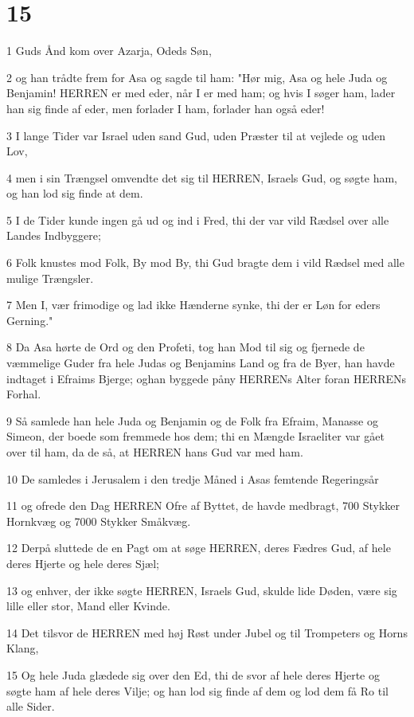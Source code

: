 \chapter{15}

\par 1 Guds Ånd kom over Azarja, Odeds Søn,
\par 2 og han trådte frem for Asa og sagde til ham: "Hør mig, Asa og hele Juda og Benjamin! HERREN er med eder, når I er med ham; og hvis I søger ham, lader han sig finde af eder, men forlader I ham, forlader han også eder!
\par 3 I lange Tider var Israel uden sand Gud, uden Præster til at vejlede og uden Lov,
\par 4 men i sin Trængsel omvendte det sig til HERREN, Israels Gud, og søgte ham, og han lod sig finde at dem.
\par 5 I de Tider kunde ingen gå ud og ind i Fred, thi der var vild Rædsel over alle Landes Indbyggere;
\par 6 Folk knustes mod Folk, By mod By, thi Gud bragte dem i vild Rædsel med alle mulige Trængsler.
\par 7 Men I, vær frimodige og lad ikke Hænderne synke, thi der er Løn for eders Gerning."
\par 8 Da Asa hørte de Ord og den Profeti, tog han Mod til sig og fjernede de væmmelige Guder fra hele Judas og Benjamins Land og fra de Byer, han havde indtaget i Efraims Bjerge; oghan byggede påny HERRENs Alter foran HERRENs Forhal.
\par 9 Så samlede han hele Juda og Benjamin og de Folk fra Efraim, Manasse og Simeon, der boede som fremmede hos dem; thi en Mængde Israeliter var gået over til ham, da de så, at HERREN hans Gud var med ham.
\par 10 De samledes i Jerusalem i den tredje Måned i Asas femtende Regeringsår
\par 11 og ofrede den Dag HERREN Ofre af Byttet, de havde medbragt, 700 Stykker Hornkvæg og 7000 Stykker Småkvæg.
\par 12 Derpå sluttede de en Pagt om at søge HERREN, deres Fædres Gud, af hele deres Hjerte og hele deres Sjæl;
\par 13 og enhver, der ikke søgte HERREN, Israels Gud, skulde lide Døden, være sig lille eller stor, Mand eller Kvinde.
\par 14 Det tilsvor de HERREN med høj Røst under Jubel og til Trompeters og Horns Klang,
\par 15 Og hele Juda glædede sig over den Ed, thi de svor af hele deres Hjerte og søgte ham af hele deres Vilje; og han lod sig finde af dem og lod dem få Ro til alle Sider.
